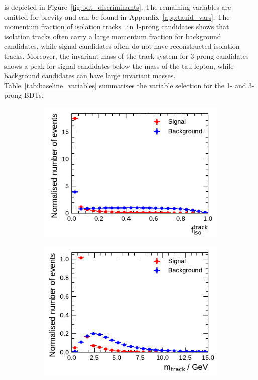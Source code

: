 is depicted in Figure~\ref{fig:bdt_discriminants}. The remaining variables are
omitted for brevity and can be found in Appendix~\ref{app:tauid_vars}. The
momentum fraction of isolation tracks~ in
1-prong \tauhadvis candidates shows that isolation tracks often carry a large
momentum fraction for background candidates, while signal candidates often do
not have reconstructed isolation tracks. Moreover, the invariant mass of the
track system for 3-prong \tauhadvis candidates shows a peak for signal
candidates below the mass of the tau lepton, while background candidates can
have large invariant masses. Table~\ref{tab:baseline_variables} summarises the
variable selection for the 1- and 3-prong BDTs.

\begin{figure}[htb]
  \begin{subfigure}[t]{0.48\textwidth}
    \centering
    \includegraphics{./figures/baseline_bdt_vars/1p/SumPtTrkFrac.pdf}
    \label{fig:sumpttrkfrac}
  \end{subfigure}\hfill
  \begin{subfigure}[t]{0.48\textwidth}
    \centering
    \includegraphics{./figures/baseline_bdt_vars/3p/massTrkSys.pdf}

\end{subfigure}
\end{figure}
